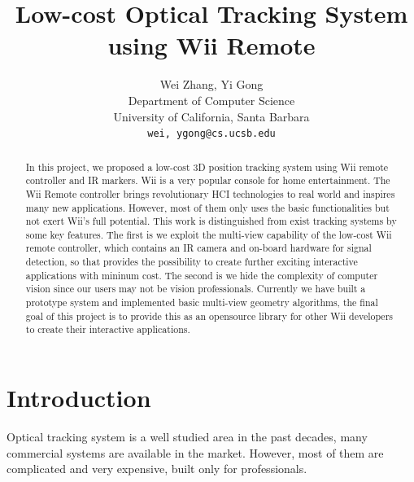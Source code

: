 \documentclass[10pt,twocolumn,letterpaper]{article}
\begin{document}
\title{Low-cost Optical Tracking System using Wii Remote}

\author{Wei Zhang, Yi Gong\\
Department of Computer Science\\
University of California, Santa Barbara\\
{\tt\small wei, ygong@cs.ucsb.edu}\\
}

\maketitle
\thispagestyle{empty}

\begin{abstract}
In this project, we proposed a low-cost 3D position tracking system using 
Wii remote controller and IR markers. 
Wii is a very popular console for home entertainment. 
The Wii Remote controller brings revolutionary HCI technologies
to real world and inspires many new applications. However, most of
them only uses the basic functionalities but not exert Wii's full potential.
This work is distinguished from exist
tracking systems by some key features. The first is we exploit the 
multi-view capability of the low-cost Wii remote controller, 
which contains an IR camera and on-board
hardware for signal detection, so that provides the possibility to create
further exciting interactive applications with mininum cost. 
The second is we hide the complexity of computer vision 
since our users may not be vision professionals. 
Currently we have built 
a prototype system and implemented basic multi-view geometry algorithms, 
the final goal of this project is to provide this as an opensource library for other 
Wii developers to create their interactive applications.
\end{abstract}
\section{Introduction}
Optical tracking system is a well studied area in the past decades, 
many commercial systems are available in the market. However, most of them 
are complicated and very expensive, built only for professionals.
\end{document}

